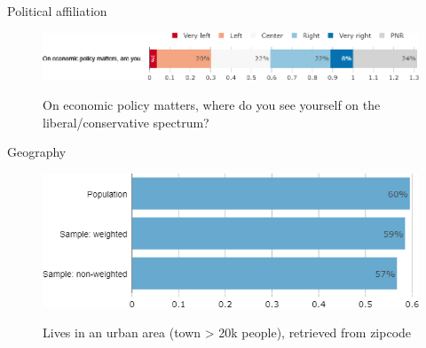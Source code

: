 \begin{framefont}{\small}
\begin{frame}{Political affiliation}%
\begin{figure}[h!]
\centering
\caption{On economic policy matters, where do you see yourself on the liberal/conservative spectrum?}
\includegraphics[width=.87\paperwidth]{../figures/FR/left_right_FR.png} \\
\end{figure}
\end{frame}

\begin{frame}{Geography}%
\begin{figure}[h!]
\centering
\caption{Lives in an urban area (town > 20k people), retrieved from zipcode}
\includegraphics[width=.43\paperwidth]{../figures/FR/urban_FR_comp.png} \\
\vspace{.2cm}
\end{figure}
\end{frame}


\end{framefont}
